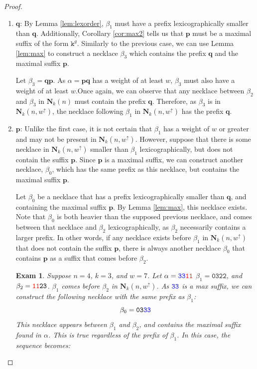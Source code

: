 \documentclass[10pt,a4paper]{amsart}
\newtheorem{exam}{Exam}
\newcommand{\bN}{\mathbf{N}}
\newcommand{\bp}{\mathbf{p}}
\newcommand{\bq}{\mathbf{q}}
\renewcommand{\tt} {\mathtt}
\begin{document}
\begin{proof}
\begin{enumerate}
    \item $\bq$: By Lemma \ref{lem:lexorder}, $\beta_1$ must have a prefix lexicographically smaller than $\bq$. Additionally, Corollary \ref{cor:max2} tells us that $\bp$ must be a maximal suffix of the form $\tt{k}^g$. Similarly to the previous case, we can use Lemma \ref{lem:max} to construct a necklace $\beta_3$ which contains the prefix $\bq$ and the maximal suffix $\bp$.
    
    Let $\beta_3 = \bq \bp$. As $\alpha=\bp \bq$ has a weight of at least $w$, $\beta_3$ must also have a weight of at least $w$.Once again, we can observe that any necklace between $\beta_2$ and $\beta_3$ in $\bN_k(n)$ must contain the prefix $\bq$. Therefore, as $\beta_3$ is in $\bN_k(n,w^\uparrow)$, the necklace following $\beta_1$ in $\bN_k(n,w^\uparrow)$ has the prefix $\bq$.

    \item $\bp$: Unlike the first case, it is not certain that $\beta_1$ has a weight of $w$ or greater and may not be present in $\bN_k(n,w^\uparrow)$. However, suppose that there is some necklace in $\bN_k(n,w^\uparrow)$ smaller than $\beta_1$ lexicographically, but does not contain the suffix $\bp$. Since $\bp$ is a maximal suffix, we can construct another necklace, $\beta_0$, which has the same prefix as this necklace, but contains the maximal suffix $\bp$. 

    Let $\beta_0$ be a necklace that has a prefix lexicographically smaller than $\bq$, and containing the maximal suffix $\bp$. By Lemma \ref{lem:max}, this necklace exists. Note that $\beta_0$ is both heavier than the supposed previous necklace, and comes between that necklace and $\beta_2$ lexicographically, as $\beta_2$ necessarily contains a larger prefix. In other words, if any necklace exists before $\beta_1$ in $\bN_k(n,w^\uparrow)$ that does not contain the suffix $\bp$, there is always another necklace $\beta_0$ that contains $\bp$ as a suffix that comes before $\beta_2$. 

    \begin{exam}
    Suppose $n=4$, $k=3$, and $w=7$. Let $\alpha = \tt{\textcolor{blue}{33}\textcolor{red}{11}}$ $\beta_1 = \tt{0322}$, and $\beta_2 = \tt{\textcolor{red}{11}23}$. $\beta_1$ comes before $\beta_2$ in $\bN_k(n,w^\uparrow)$. As $\tt{\textcolor{blue}{33}}$ is a max suffix, we can construct the following necklace with the same prefix as $\beta_1$:
    \[ \beta_0 = \tt{03\textcolor{blue}{33}} \]
    This necklace appears between $\beta_1$ and $\beta_2$, and contains the maximal suffix found in $\alpha$. This is true regardless of the prefix of $\beta_1$. In this case, the sequence becomes:
    

\end{exam}
\end{enumerate}
\end{proof}
\end{document}
